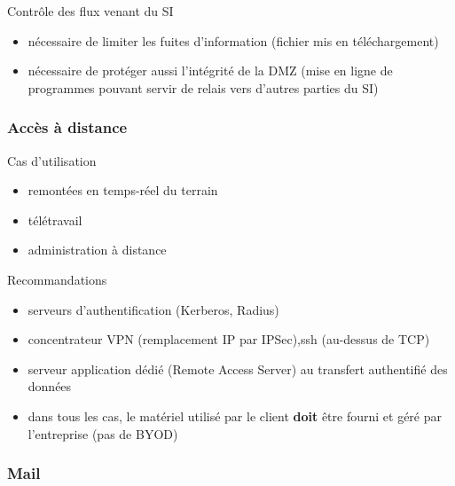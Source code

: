 \begin{reveals}
\begin{frame}
  \vfill

  \begin{block}{Contrôle des flux venant du SI}
    \begin{itemize}
    \item nécessaire de limiter les fuites d'information (fichier mis en téléchargement)
    \item nécessaire de protéger aussi l'intégrité de la DMZ (mise en
      ligne de programmes pouvant servir de relais vers d'autres
      parties du SI)
    \end{itemize}
  \end{block}

  \vfill
\end{frame}


\begin{frame}
  \frametitle{Accès à distance}

  \vfill

   \begin{block}{Cas d'utilisation}
     \begin{itemize}
     \item remontées en temps-réel du terrain
     \item télétravail
     \item administration à distance
     \end{itemize}
  \end{block}

  \vfill

\begin{block}{Recommandations}
  \begin{itemize}
  \item serveurs d'authentification (Kerberos, Radius)
  \item concentrateur VPN (remplacement IP par IPSec),ssh (au-dessus de TCP)
  \item serveur application dédié (Remote Access Server) au transfert authentifié des données
  \item dans tous les cas, le matériel utilisé par le client
    \textbf{doit} être fourni et géré par l'entreprise (pas de BYOD)
  \end{itemize}
  \end{block}

  \vfill

\end{frame}

\begin{frame}
  \frametitle{Mail}

  \vfill


\end{frame}
\end{reveals}
